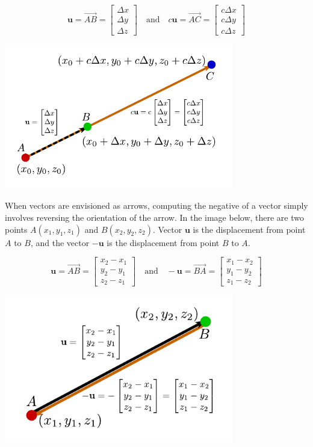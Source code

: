 \documentclass{article}
\begin{document}
\[\mathbf{u} = \overrightarrow{AB} = \begin{bmatrix} \Delta x \\ \Delta y \\ \Delta z \end{bmatrix} \quad\text{and}\quad c\mathbf{u} = \overrightarrow{AC} = \begin{bmatrix} c\Delta x \\ c\Delta y \\ c\Delta z \end{bmatrix}\]

\begin{center}
\includegraphics[width = 0.75\textwidth]{displacement_scalar_multiplication}
\end{center}


When vectors are envisioned as arrows, computing the negative of a vector simply involves reversing the orientation of the arrow. In the image below, there are two points \(A(x_1, y_1, z_1)\) and \(B(x_2, y_2, z_2)\). Vector \(\mathbf{u}\) is the displacement from point \(A\) to \(B\), and the vector \(-\mathbf{u}\) is the displacement from point \(B\) to \(A\).

\[\mathbf{u} = \overrightarrow{AB} = \begin{bmatrix} x_2 - x_1 \\ y_2 - y_1 \\ z_2 - z_1 \end{bmatrix} \quad\text{and}\quad -\mathbf{u} = \overrightarrow{BA} = \begin{bmatrix} x_1 - x_2 \\ y_1 - y_2 \\ z_1 - z_2 \end{bmatrix}\]

\begin{center}
\includegraphics[width = 0.75\textwidth]{displacement_vector_negative}
\end{center}
\end{document}
